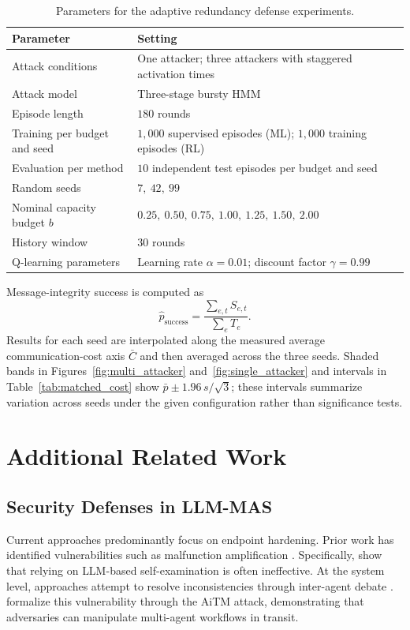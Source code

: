 \documentclass{article}
\begin{document}
\begin{table}[t]
\centering
\small
\caption{Parameters for the adaptive redundancy defense experiments.}
\label{tab:params}
\begin{tabular}{ll}
\toprule
\textbf{Parameter} & \textbf{Setting} \\
\midrule
Attack conditions & One attacker; three attackers with staggered activation times \\
Attack model & Three-stage bursty {HMM} \\
Episode length & $180$ rounds \\
Training per budget and seed & $1{,}000$ supervised episodes ({ML}); $1{,}000$ training episodes ({RL}) \\
Evaluation per method & $10$ independent test episodes per budget and seed \\
Random seeds & $7,\ 42,\ 99$ \\
Nominal capacity budget $b$ & $0.25,\ 0.50,\ 0.75,\ 1.00,\ 1.25,\ 1.50,\ 2.00$ \\
History window & $30$ rounds \\
Q-learning parameters & Learning rate $\alpha = 0.01$; discount factor $\gamma = 0.99$ \\
\bottomrule
\end{tabular}
\end{table}

Message-integrity success is computed as
\[
\hat{p}_{\mathrm{success}} = \frac{\sum_{e, t} S_{e, t}}{\sum_e T_e}.
\]
Results for each seed are interpolated along the measured average communication-cost axis $\bar{C}$ and then averaged across the three seeds. Shaded bands in Figures~\ref{fig:multi_attacker} and~\ref{fig:single_attacker} and intervals in Table~\ref{tab:matched_cost} show $\bar{p} \pm 1.96\, s / \sqrt{3}$; these intervals summarize variation across seeds under the given configuration rather than significance tests.

\section{Additional Related Work}

\subsection{Security Defenses in {LLM-MAS}}
Current approaches predominantly focus on endpoint hardening. Prior work has identified vulnerabilities such as malfunction amplification \citep{zhang2024breaking}. Specifically, \citet{zhang2024breaking} show that relying on {LLM}-based self-examination is often ineffective. At the system level, approaches attempt to resolve inconsistencies through inter-agent debate \citep{xiong2023inter, amayuelas2024multiagent}. \citet{he2025redteaming} formalize this vulnerability through the {AiTM} attack, demonstrating that adversaries can manipulate multi-agent workflows in transit.
\end{document}
